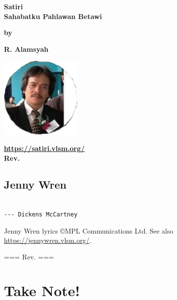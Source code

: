 \documentclass[12pt]{book}
\newcommand{\pengarangs}{%
    R. Alamsyah\\
}
\newcommand{\judul}{%
Satiri\\[13pt]
Sahabatku Pahlawan Betawi
}
\begin{document}
\begin{titlepage}
    \begin{center}    

    \vspace*{35mm}
    \textbf{\Large \judul}

    \vspace*{30mm}       
    \textbf{by}

    \vspace*{15mm}    
    \textbf{\Large \pengarangs}

    \vspace*{4.0cm}

    \begin{center}
        \includegraphics[width=40mm]{satiri.jpg}
    \end{center}

    \textbf{
       \url{https://satiri.vlsm.org/} \\[10pt]
       Rev. \rev%
    }


    \end{center}

\end{titlepage}


\tableofcontents

\newpage

\chapter*{Jenny Wren}

\begin{verbatim}

--- Dickens McCartney
\end{verbatim}

\noindent
Jenny Wren lyrics \copyright MPL Communications Ltd. See also \url{https://jennywren.vlsm.org/}.
\newpage


\noindent
=== Rev. \rev ===

\newpage




\part{Take Note!}



\end{document}
